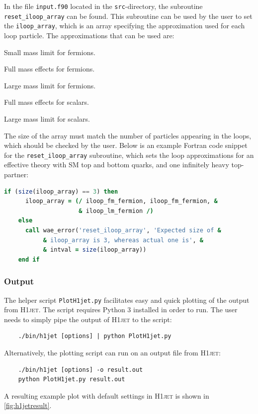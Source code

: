 \documentclass[12pt]{article}
\begin{document}
In the file \texttt{input.f90} located in the \texttt{src}-directory, the subroutine \texttt{reset\_iloop\_array} can be found. This subroutine can be used by the user to set the \texttt{iloop\_array}, which is an array specifying the approximation used for each loop particle. The approximations that can be used are: 
\begin{description}[labelindent=1cm, labelwidth =\widthof{\bfseries9999999999999999999}, leftmargin = !] 
	\item[\texttt{iloop\_sm\_fermion}] Small mass limit for fermions. 
	\item[\texttt{iloop\_fm\_fermion}] Full mass effects for fermions. 
	\item[\texttt{iloop\_lm\_fermion}] Large mass limit for fermions. 
	\item[\texttt{iloop\_fm\_scalar}] Full mass effects for scalars. 
	\item[\texttt{iloop\_lm\_scalar}] Large mass limit for scalars. 
\end{description}
The size of the array must match the number of particles appearing in the loops, which should be checked by the user. Below is an example Fortran code snippet for the \texttt{reset\_iloop\_array} subroutine, which sets the loop approximations for an effective theory with SM top and bottom quarks, and one infinitely heavy top-partner: 
\begin{lstlisting}[language=Fortran, 
                   keywordstyle=\color{Red},
                   stringstyle=\color{Green},
                   identifierstyle=\color{Blue},
                   showstringspaces=false]
    if (size(iloop_array) == 3) then
      iloop_array = (/ iloop_fm_fermion, iloop_fm_fermion, &
                     & iloop_lm_fermion /)
    else
      call wae_error('reset_iloop_array', 'Expected size of &
           & iloop_array is 3, whereas actual one is', &
           & intval = size(iloop_array))
    end if
\end{lstlisting}

\subsubsection{Output} 

The helper script \texttt{PlotH1jet.py} facilitates easy and quick
plotting of the output from \textsc{H1jet}. The script requires Python
3 installed in order to run. The user needs to simply pipe the output
of \textsc{H1jet} to the script:
\begin{lstlisting}
	./bin/h1jet [options] | python PlotH1jet.py 
\end{lstlisting}
Alternatively, the plotting script can run on an output file from \textsc{H1jet}: 
\begin{lstlisting}
	./bin/h1jet [options] -o result.out 
	python PlotH1jet.py result.out 
\end{lstlisting}
A resulting example plot with default settings in \textsc{H1jet} is shown in \autoref{fig:h1jetresult}. 
\end{document}
